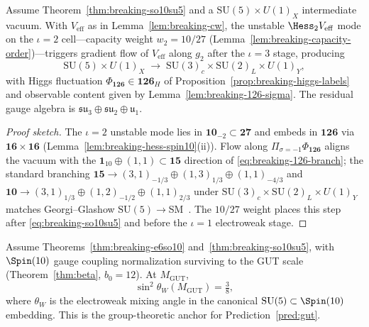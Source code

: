 \begin{theorem}\label{thm:breaking-su5sm}
Assume Theorem~\ref{thm:breaking-so10su5} and a
$\mathrm{SU}(5)\times U(1)_X$ intermediate vacuum. With $V_{\mathrm{eff}}$ as
in Lemma~\ref{lem:breaking-cw}, the unstable $\Hess_2 V_{\mathrm{eff}}$ mode on
the $\iota=2$ cell---capacity weight $w_2=10/27$
(Lemma~\ref{lem:breaking-capacity-order})---triggers gradient flow of
$V_{\mathrm{eff}}$ along $g_2$ after the $\iota=3$ stage, producing
\begin{equation}\label{eq:breaking-su5sm}
  \mathrm{SU}(5)\times U(1)_X
  \;\longrightarrow\;
  \mathrm{SU}(3)_c\times\mathrm{SU}(2)_L\times U(1)_Y,
\end{equation}
with Higgs fluctuation $\Phi_{\mathbf{126}}\in\mathbf{126}_H$ of
Proposition~\ref{prop:breaking-higgs-labels} and observable content given by
Lemma~\ref{lem:breaking-126-sigma}. The residual gauge algebra is
$\mathfrak{su}_3\oplus\mathfrak{su}_2\oplus\mathfrak{u}_1$.
\end{theorem}

\begin{proof}[Proof sketch]
The $\iota=2$ unstable mode lies in $\mathbf{10}_{-2}\subset\mathbf{27}$ and
embeds in $\mathbf{126}$ via $\mathbf{16}\times\mathbf{16}$
(Lemma~\ref{lem:breaking-hess-spin10}(ii)). Flow along
$\Pi_{\sigma=-1}\Phi_{\mathbf{126}}$ aligns the vacuum with the
$\mathbf{1}_{10}\oplus(1,1)\subset\mathbf{15}$ direction of
\eqref{eq:breaking-126-branch}; the standard branching
$\mathbf{15}\to(3,1)_{-1/3}\oplus(1,3)_{1/3}\oplus(1,1)_{-4/3}$ and
$\mathbf{10}\to(3,1)_{1/3}\oplus(1,2)_{-1/2}\oplus(1,1)_{2/3}$ under
$\mathrm{SU}(3)_c\times\mathrm{SU}(2)_L\times U(1)_Y$ matches Georgi--Glashow
$\mathrm{SU}(5)\to$SM~\cite{GeorgiGlashow1974}. The $10/27$ weight places this
step after \eqref{eq:breaking-so10su5} and before the $\iota=1$
electroweak stage.
\end{proof}

\begin{proposition}
\label{prop:weinberg-gut}
Assume Theorems~\ref{thm:breaking-e6so10} and~\ref{thm:breaking-so10su5}, with
$\Spin(10)$ gauge coupling normalization surviving to the GUT scale
(Theorem~\ref{thm:beta}, $b_0=12$). At $M_{\mathrm{GUT}}$,
\begin{equation}\label{eq:weinberg-gut}
  \sin^2\theta_W(M_{\mathrm{GUT}})=\tfrac38,
\end{equation}
where $\theta_W$ is the electroweak mixing angle in the canonical
$\mathrm{SU}(5)\subset\Spin(10)$ embedding. This is the group-theoretic anchor
for Prediction~\ref{pred:gut}.
\end{proposition}

